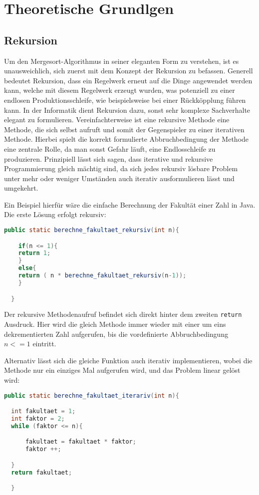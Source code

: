 \chapter{Theoretische Grundlgen}\label{chap:theoretische-grundlagen}
\section{Rekursion}
Um den Mergesort-Algorithmus in seiner eleganten Form zu verstehen, ist es unausweichlich, sich zuerst mit dem
Konzept der Rekursion zu befassen. Generell bedeutet Rekursion, dass ein Regelwerk erneut auf die Dinge angewendet werden kann,
welche mit diesem Regelwerk erzeugt wurden, was potenziell zu einer endlosen Produktionsschleife, wie beispielsweise bei einer Rückköpplung
führen kann. In der Informatik dient Rekursion dazu, sonst sehr komplexe Sachverhalte elegant zu formulieren. Vereinfachterweise ist eine rekursive Methode
eine Methode, die sich selbst aufruft und somit der Gegenspieler zu einer iterativen Methode. Hierbei spielt die korrekt formulierte Abbruchbedingung der Methode eine zentrale Rolle, da man sonst Gefahr läuft,
eine Endlosschleife zu produzieren. Prinzipiell lässt sich sagen, dass iterative und rekursive Programmierung gleich mächtig sind, da sich jedes rekursiv lösbare Problem
unter mehr oder weniger Umständen auch iterativ ausformulieren lässt und umgekehrt.

Ein Beispiel hierfür wäre die einfache Berechnung der Fakultät einer Zahl in Java. Die erste Lösung erfolgt rekursiv:

\begin{lstlisting}[language=Java]
  public static berechne_fakultaet_rekursiv(int n){

    if(n <= 1){
    return 1;
    }
    else{
    return ( n * berechne_fakultaet_rekursiv(n-1));
    }

  }
\end{lstlisting}

Der rekursive Methodenaufruf befindet sich direkt hinter dem zweiten \texttt{return} Ausdruck. Hier wird die gleich Methode immer wieder
mit einer um eins dekrementierten Zahl aufgerufen, bis die vordefinierte Abbruchbedingung $n <= 1$ eintritt.

Alternativ lässt sich die gleiche Funktion auch iterativ implementieren, wobei die Methode nur ein einziges Mal aufgerufen wird, und das Problem linear gelöst wird:

\begin{lstlisting}[language=Java]
  public static berechne_fakultaet_iterariv(int n){

  int fakultaet = 1;
  int faktor = 2;
  while (faktor <= n){

      fakultaet = fakultaet * faktor;
      faktor ++;

  }
  return fakultaet;

  }
\end{lstlisting}

